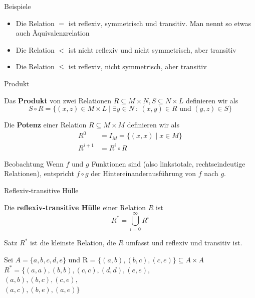 \begin{frame}{Beispiele}
	\begin{itemize}
		\item Die Relation $=$ ist \pause reflexiv, symmetrisch und transitiv. Man nennt so etwas auch Äquivalenzrelation
		\item \pause Die Relation $<$ ist \pause nicht reflexiv und nicht symmetrisch, aber transitiv
		\item \pause Die Relation $\leq$ ist \pause reflexiv, nicht symmetrisch, aber transitiv
	\end{itemize}
\end{frame}

\begin{frame}{Produkt}
	\begin{Definition}
		Das \textbf{Produkt} von zwei Relationen $R \subseteq M \times N, S \subseteq N \times L$ definieren wir als $$S \circ R = \{(x,z) \in M \times L \mid \exists y \in N \ : \ (x,y) \in R \text{ und } (y,z) \in S \}$$
	\end{Definition}	
	\pause
	
	\begin{Definition}
		Die \textbf{Potenz} einer Relation $R \subseteq M \times M$ definieren wir als
		\begin{align*}
			R^0 &= I_M = \{(x,x) \mid x \in M \} \\
			R^{i+1} &= R^i \circ R
		\end{align*}
	\end{Definition}

	\pause
	\begin{block}{Beobachtung}
		Wenn $f$ und $g$ Funktionen sind (also linkstotale, rechtseindeutige Relationen), entspricht $f \circ g$ der Hintereinanderausführung von $f$ nach $g$.
	\end{block}
\end{frame}

\begin{frame}{Reflexiv-transitive Hülle}
	\begin{Definition}
		Die \textbf{reflexiv-transitive Hülle} einer Relation $R$ ist
		$$R^\ast = \bigcup \limits_{i=0}^\infty R^i$$
	\end{Definition}

	\pause
	\begin{block}{Satz}
		$R^*$ ist die kleinste Relation, die $R$ umfasst und reflexiv und
		transitiv ist.
	\end{block}

	\pause
	\begin{Beispiel}
		Sei $A = \{a, b, c, d, e\}$ und R = $\{(a, b), (b, c), (c, e)\} \subseteq A \times A$\\ \pause
		$R^*=\{(a,a), (b,b), (c,c), (d,d), (e,e),$ \\
		$(a,b), (b,c), (c,e),$ \\
		$(a,c), (b,e),(a,e)\}$
	\end{Beispiel}
	
\end{frame}

